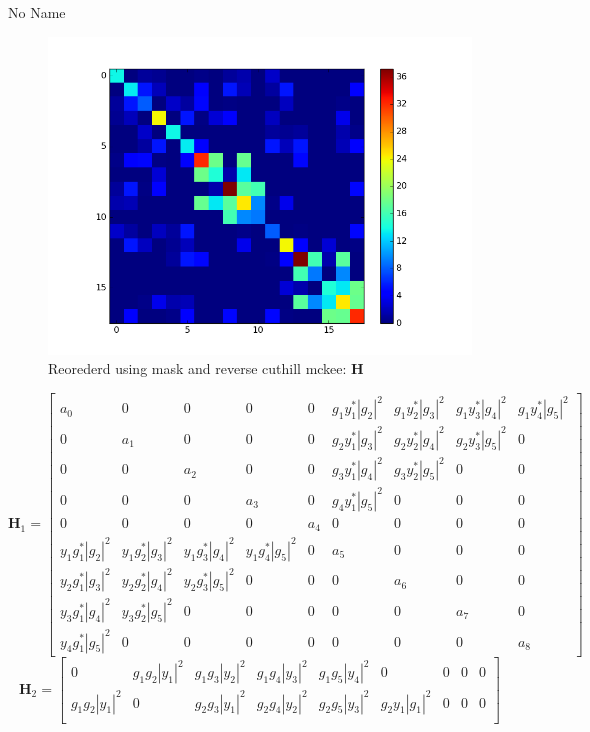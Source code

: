 \documentclass[a4paper,10pt]{article}
\begin{document}
\begin{section}{No Name}
\begin{figure}
  \includegraphics[width=\linewidth]{Hessian_reordered.png}
  \caption{Reorederd using mask and reverse cuthill mckee: $\boldsymbol{H}$}
\end{figure}
\begin{landscape}
\begin{equation}
\boldsymbol{H}_1 = 
\begin{bmatrix}
a_{0}&0&0&0&0&g_1y_1^*|g_2|^2&g_1y_2^*|g_3|^2&g_1y_3^*|g_4|^2&g_1y_4^*|g_5|^2\\
0&a_{1}&0&0&0&g_2y_1^*|g_3|^2&g_2y_2^*|g_4|^2&g_2y_3^*|g_5|^2&0\\
0&0&a_{2}&0&0&g_3y_1^*|g_4|^2&g_3y_2^*|g_5|^2&0&0\\
0&0&0&a_{3}&0&g_4y_1^*|g_5|^2&0&0&0\\
0&0&0&0&a_{4}&0&0&0&0\\
y_1g_1^*|g_2|^2&y_1g_2^*|g_3|^2&y_1g_3^*|g_4|^2&y_1g_4^*|g_5|^2&0&a_{5}&0&0&0\\
y_2g_1^*|g_3|^2&y_2g_2^*|g_4|^2&y_2g_3^*|g_5|^2&0&0&0&a_{6}&0&0\\
y_3g_1^*|g_4|^2&y_3g_2^*|g_5|^2&0&0&0&0&0&a_{7}&0\\
y_4g_1^*|g_5|^2&0&0&0&0&0&0&0&a_{8}
\end{bmatrix}
\end{equation}
\begin{equation}
\boldsymbol{H}_2 = 
\begin{bmatrix}
0&g_1g_2|y_1|^2&g_1g_3|y_2|^2&g_1g_4|y_3|^2&g_1g_5|y_4|^2&0&0&0&0\\
g_1g_2|y_1|^2&0&g_2g_3|y_1|^2&g_2g_4|y_2|^2&g_2g_5|y_3|^2&g_2y_1|g_1|^2&0&0&0\\

\end{bmatrix}
\end{equation}
\end{landscape}
\end{section}
\end{document}
